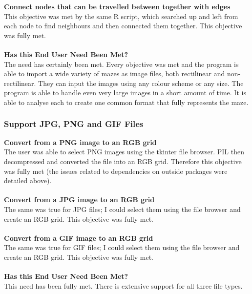 \documentclass[titlepage]{article}
\begin{document}
\textbf{Connect nodes that can be travelled between together with edges}\\
This objective was met by the same R script, which searched up and left from each node to find neighbours and then connected them together. This objective was fully met.\\\\
\textbf{Has this End User Need Been Met?}\\
The need has certainly been met. Every objective was met and the program is able to import a wide variety of mazes as image files, both rectilinear and non-rectilinear. They can input the images using any colour scheme or any size. The program is able to handle even very large images in a short amount of time. It is able to analyse each to create one common format that fully represents the maze. 

\subsubsection{Support JPG, PNG and GIF Files}
\textbf{Convert from a PNG image to an RGB grid}\\
The user was able to select PNG images using the tkinter file browser. PIL then decompressed and converted the file into an RGB grid. Therefore this objective was fully met (the issues related to dependencies on outside packages were detailed above).\\\\
\textbf{Convert from a JPG image to an RGB grid}\\
The same was true for JPG files; I could select them using the file browser and create an RGB grid. This objective was fully met.\\\\
\textbf{Convert from a GIF image to an RGB grid}\\
The same was true for GIF files; I could select them using the file browser and create an RGB grid. This objective was fully met.\\\\
\textbf{Has this End User Need Been Met?}\\
This need has been fully met. There is extensive support for all three file types. 
\end{document}
